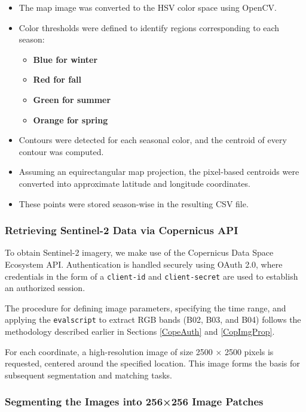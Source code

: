\begin{itemize}
    \item The map image was converted to the HSV color space using OpenCV.
    \item Color thresholds were defined to identify regions corresponding to each season:
    \begin{itemize}
        \item \textbf{Blue for winter} 
        \item \textbf{Red for fall}
        \item \textbf{Green for summer}
        \item \textbf{Orange for spring}
    \end{itemize}
    \item Contours were detected for each seasonal color, and the centroid of every contour was computed.
    \item Assuming an equirectangular map projection, the pixel-based centroids were converted into approximate latitude and longitude coordinates.
    \item These points were stored season-wise in the resulting CSV file.
\end{itemize}

\subsubsection{Retrieving Sentinel-2 Data via Copernicus API}

To obtain Sentinel-2 imagery, we make use of the Copernicus Data Space Ecosystem API. Authentication is handled securely using OAuth 2.0, where credentials in the form of a \texttt{client-id} and \texttt{client-secret} are used to establish an authorized session.

The procedure for defining image parameters, specifying the time range, and applying the \texttt{evalscript} to extract RGB bands (B02, B03, and B04) follows the methodology described earlier in Sections \ref{CopeAuth} and \ref{CopImgProp}.

For each coordinate, a high-resolution image of size 2500 × 2500 pixels is requested, centered around the specified location. This image forms the basis for subsequent segmentation and matching tasks.

\subsubsection{Segmenting the Images into 256×256 Image Patches}

